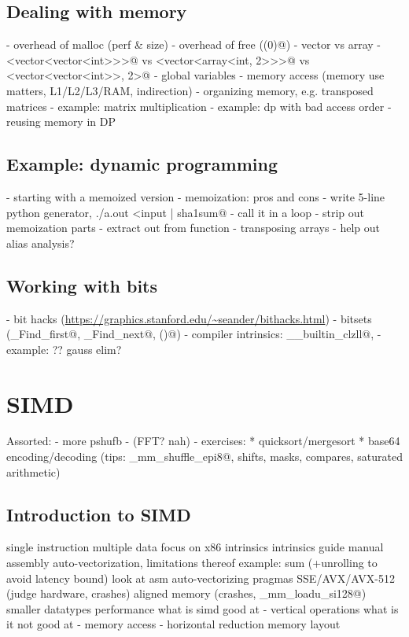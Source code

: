 \documentclass[openany]{book}
\begin{document}
\chapter{Dealing with memory}
- overhead of malloc (perf \& size)
- overhead of free (\verb@exit(0)@)
- vector vs array
- \verb@vector<vector<vector<int>>>@ vs \verb@vector<vector<array<int, 2>>>@ vs \verb@array<vector<vector<int>>, 2>@
- global variables
- memory access (memory use matters, L1/L2/L3/RAM, indirection)
- organizing memory, e.g. transposed matrices
- example: matrix multiplication
- example: dp with bad access order
- reusing memory in DP
\chapter{Example: dynamic programming}
- starting with a memoized version
- memoization: pros and cons
- write 5-line python generator, \verb@./a.out <input | sha1sum@
- call it in a loop
- strip out memoization parts
- extract out from function
- transposing arrays
- help out alias analysis?
\chapter{Working with bits}
- bit hacks (\url{https://graphics.stanford.edu/~seander/bithacks.html})
- bitsets (\verb@_Find_first@, \verb@_Find_next@, \verb@count()@)
- compiler intrinsics: \verb@__builtin_clzll@, \verb@popcountll@
- example: ?? gauss elim?

\part{SIMD}

Assorted:
- more pshufb
- (FFT? nah)
- exercises:
 * quicksort/mergesort
 * base64 encoding/decoding (tips: \verb@_mm_shuffle_epi8@, shifts, masks, compares, saturated arithmetic)

\chapter{Introduction to SIMD}
single instruction multiple data
focus on x86
intrinsics
intrinsics guide
manual assembly
auto-vectorization, limitations thereof
example: sum (+unrolling to avoid latency bound)
look at asm
auto-vectorizing
pragmas
SSE/AVX/AVX-512 (judge hardware, crashes)
aligned memory (crashes, \verb@_mm_loadu_si128@)
smaller datatypes
performance
what is simd good at
- vertical operations
what is it not good at
- memory access
- horizontal reduction
memory layout
\end{document}
